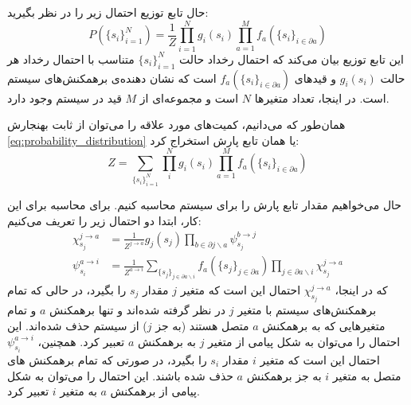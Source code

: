 \begin{appendices}
    حال تابع توزیع احتمال زیر را در نظر بگیرید:
    \begin{equation} \label{eq:probability_distribution}
        P \left( \{ s_{i} \}_{i=1}^{N} \right) = \frac{1}{Z} \prod_{i=1}^{N} g_{i}(s_{i}) \prod_{a=1}^{M} f_{a}(\{ s_{i} \}_{i \in \partial a})
    \end{equation}
    این تابع توزیع بیان می‌کند که احتمال رخداد حالت
    \( \{ s_{i} \}_{i=1}^{N} \)
    متناسب با احتمال رخداد هر حالت
    \( g_{i}(s_{i}) \)
    و قیدهای
    \( f_{a}(\{ s_{i} \}_{i \in \partial a}) \)
    است که نشان دهنده‌ی برهمکنش‌های سیستم است.
    در اینجا، تعداد متغیرها
    \( N \)
    است و مجموعه‌ای از
    \( M \)
    قید در سیستم وجود دارد.

    همان‌طور که می‌دانیم، کمیت‌های مورد علاقه را می‌توان از ثابت بهنجارش
    \autoref{eq:probability_distribution}
    یا همان تابع پارش استخراج کرد:
    \begin{equation}
        Z = \sum_{\{ s_{i} \}_{i=1}^{N}} \prod_{i}^{N} g_{i}(s_{i}) \prod_{a=1}^{M} f_{a}(\{ s_{i} \}_{i \in \partial a})
    \end{equation}

    حال می‌خواهیم مقدار تابع پارش را برای سیستم محاسبه کنیم.
    برای محاسبه برای این کار، ابتدا دو احتمال زیر را تعریف می‌کنیم:
    \begin{align}
        \chi_{s_{j}}^{j \to a} & = \frac{1}{Z^{j \to a}} g_j(s_j) \prod_{b \in \partial j \backslash a} \psi_{s_{j}}^{b \to j}                                                                                               \\
        \psi_{s_{i}}^{a \to i} & = \frac{1}{Z^{a \to i}} \sum_{\{ s_{j} \}_{j \in \partial a \backslash i}} f_{a} \left( \{ s_{j} \}_{j \in \partial a} \right) \prod_{j \in \partial a \backslash i} \chi_{s_{j}}^{j \to a}
    \end{align}
    که در اینجا،
    \( \chi_{s_{j}}^{j \to a} \)
    احتمال این است که متغیر
    \( j \)
    مقدار
    \( s_{j} \)
    را بگیرد، در حالی که تمام برهمکنش‌های سیستم با متغیر
    \( j \)
    در نظر گرفته شده‌اند و تنها برهمکنش
    \( a \)
    و تمام متغیرهایی که به برهمکنش
    \( a \)
    متصل هستند (به جز
    \( j \))
    از سیستم حذف شده‌اند.
    این احتمال را می‌توان به شکل پیامی از متغیر
    \( j \)
    به برهمکنش
    \( a \)
    تعبیر کرد.
    همچنین،
    \( \psi_{s_{i}}^{a \to i} \)
    احتمال این است که متغیر
    \( i \)
    مقدار
    \( s_{i} \)
    را بگیرد، در صورتی که تمام برهمکنش های متصل به متغیر
    \( i \)
    به جز برهمکنش
    \( a \)
    حذف شده باشند.
    این احتمال را می‌توان به شکل پیامی از برهمکنش
    \( a \)
    به متغیر
    \( i \)
    تعبیر کرد.


\end{appendices}
